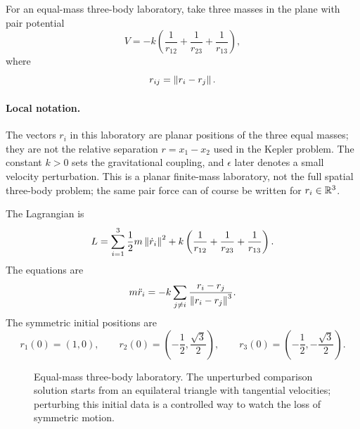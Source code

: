 For an equal-mass three-body laboratory, take three masses in the plane with
pair potential
\[
  V=-k\left(\frac1{r_{12}}+\frac1{r_{23}}+\frac1{r_{13}}\right),
\]
where
\[
  r_{ij}=\left\lVert r_i-r_j\right\rVert.
\]

\paragraph{Local notation.}
The vectors \(r_i\) in this laboratory are planar positions of the three equal
masses; they are not the relative separation \(r=x_1-x_2\) used in the Kepler
problem.  The constant \(k>0\) sets the gravitational coupling, and
\(\epsilon\) later denotes a small velocity perturbation.  This is a planar
finite-mass laboratory, not the full spatial three-body problem; the same
pair force can of course be written for \(r_i\in\mathbb{R}^3\).

The Lagrangian is
\[
  L=\sum_{i=1}^3\frac12m\left\lVert \dot r_i\right\rVert^2
  +
  k\left(\frac1{r_{12}}+\frac1{r_{23}}+\frac1{r_{13}}\right).
\]
The equations are
\[
  m\ddot r_i
  =
  -k\sum_{j\neq i}\frac{r_i-r_j}{\left\lVert r_i-r_j\right\rVert^3}.
\]
The symmetric initial positions are
\[
  r_1(0)=(1,0),
  \qquad
  r_2(0)=\left(-\frac12,\frac{\sqrt3}{2}\right),
  \qquad
  r_3(0)=\left(-\frac12,-\frac{\sqrt3}{2}\right).
\]

\begin{figure}[htbp]
\centering
{}
\caption{Equal-mass three-body laboratory. The unperturbed comparison solution
starts from an equilateral triangle with tangential velocities; perturbing this
initial data is a controlled way to watch the loss of symmetric motion.}
\label{fig:lab-three-body-initial-data}
\end{figure}
\FloatBarrier

